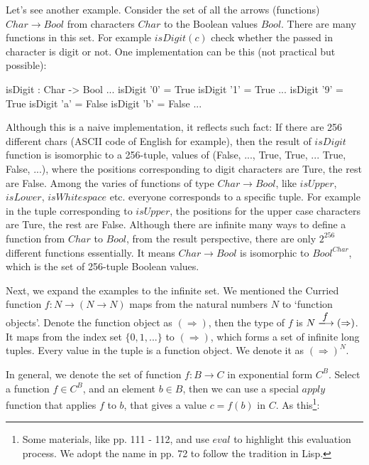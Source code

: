 \documentclass[b5paper]{article}
\begin{document}
\begin{example}
\normalfont
Let's see another example. Consider the set of all the arrows (functions) $Char \to Bool$ from characters $Char$ to the Boolean values $Bool$. There are many functions in this set. For example $isDigit(c)$ check whether the passed in character is digit or not. One implementation can be this (not practical but possible):

\begin{Haskell}[frame=none]
isDigit : Char -> Bool
...
isDigit '0' = True
isDigit '1' = True
...
isDigit '9' = True
isDigit 'a' = False
isDigit 'b' = False
...
\end{Haskell}

Although this is a naive implementation, it reflects such fact: If there are 256 different chars (ASCII code of English for example), then the result of $isDigit$ function is isomorphic to a 256-tuple, values of (False, ..., True, True, ... True, False, ...), where the positions corresponding to digit characters are Ture, the rest are False. Among the varies of functions of type $Char \to Bool$, like $isUpper$, $isLower$, $isWhitespace$ etc. everyone corresponds to a specific tuple. For example in the tuple corresponding to $isUpper$, the positions for the upper case characters are Ture, the rest are False. Although there are infinite many ways to define a function from $Char$ to $Bool$, from the result perspective, there are only $2^{256}$ different functions essentially. It means $Char \to Bool$ is isomorphic to $Bool^{Char}$, which is the set of 256-tuple Boolean values.
\end{example}

Next, we expand the examples to the infinite set. We mentioned the Curried function $f: N \to (N \to N)$ maps from the natural numbers $N$ to `function objects'. Denote the function object as $(\Rightarrow)$, then the type of $f$ is $N \arrowto{f} (\Rightarrow)$. It maps from the index set $\{0, 1, ...\}$ to $(\Rightarrow)$, which forms a set of infinite long tuples. Every value in the tuple is a function object. We denote it as $(\Rightarrow)^N$.

In general, we denote the set of function $f : B \to C$ in exponential form $C^B$. Select a function $f \in C^B$, and an element $b \in B$, then we can use a special $apply$ function that applies $f$ to $b$, that gives a value $c = f(b)$ in $C$. As this\footnote{Some materials, like \cite{PeterSmith2018} pp. 111 - 112, and \cite{Wiki-Exponentials} use $eval$ to highlight this evaluation process. We adopt the name in \cite{Bird97} pp. 72 to follow the tradition in Lisp.}:
\end{document}

